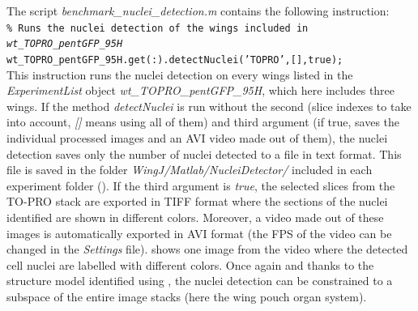 The script \textit{benchmark\_nuclei\_detection.m} contains the following instruction:\\

\footnotesize\texttt{\% Runs the nuclei detection of the wings included in \textit{wt\_TOPRO\_pentGFP\_95H}\\
wt\_TOPRO\_pentGFP\_95H.get(:).detectNuclei('TOPRO',[],true);}\normalsize\\

This instruction runs the nuclei detection on every wings listed in the \textit{ExperimentList} object \textit{wt\_TOPRO\_pentGFP\_95H}, which here includes three wings. If the method \textit{detectNuclei} is run without the second (slice indexes to take into account, \textit{[]} means using all of them) and third argument (if true, saves the individual processed images and an AVI video made out of them), the nuclei detection saves only the number of nuclei detected to a file in text format. This file is saved in the folder \textit{WingJ/Matlab/NucleiDetector/} included in each experiment folder (). If the third argument is \textit{true}, the selected slices from the TO-PRO stack are exported in TIFF format where the sections of the nuclei identified are shown in different colors. Moreover, a video made out of these images is automatically exported in AVI format (the FPS of the video can be changed in the \wingj \matlab \emph{Settings} file).  shows one image from the video where the detected cell nuclei are labelled with different colors. Once again and thanks to the structure model identified using \wingj, the nuclei detection can be constrained to a subspace of the entire image stacks (here the wing pouch organ system).\\


